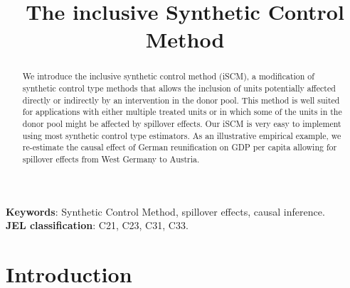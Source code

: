 
\title{The inclusive Synthetic Control Method}
\maketitle
\begin{abstract}
We introduce the inclusive synthetic control method (iSCM), a modification of synthetic control type methods that allows the inclusion of units potentially affected directly or indirectly by an intervention in the donor pool. This method is well suited for applications with either multiple treated units or in which some of the units in the donor pool might be affected by spillover effects. Our iSCM is very easy to implement using most synthetic control type estimators.  As an illustrative empirical example, we re-estimate the causal effect of German reunification on GDP per capita allowing for spillover effects from West Germany to Austria.





\end{abstract}
\textbf{Keywords}: Synthetic Control Method, spillover effects, causal inference.\\
\textbf{JEL classification}: C21, C23, C31, C33.

\newpage

\section{Introduction}



